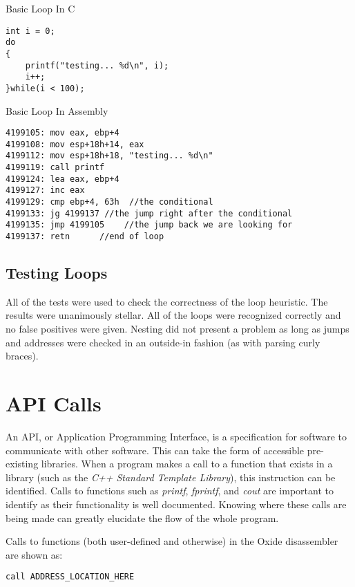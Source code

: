 \documentclass{article}
\begin{document}
\begin{algorithm}
\lstset{language=[mips]Assembler}
\caption{Basic Loop In C}
\begin{lstlisting}
int i = 0;
do
{
    printf("testing... %d\n", i);
    i++;
}while(i < 100);
\end{lstlisting}
\end{algorithm}

\begin{algorithm}
\lstset{language=[mips]Assembler}
\caption{Basic Loop In Assembly}
\begin{lstlisting}
4199105: mov eax, ebp+4
4199108: mov esp+18h+14, eax
4199112: mov esp+18h+18, "testing... %d\n"
4199119: call printf
4199124: lea eax, ebp+4
4199127: inc eax
4199129: cmp ebp+4, 63h  //the conditional
4199133: jg 4199137	//the jump right after the conditional
4199135: jmp 4199105    //the jump back we are looking for
4199137: retn      //end of loop
\end{lstlisting}
\end{algorithm}

\subsection*{Testing Loops}
All of the tests were used to check the correctness of the loop heuristic.  The results were unanimously stellar.  All of the loops were recognized
correctly and no false positives were given.  Nesting did not present a problem as long as jumps and addresses were checked in an outside-in fashion
(as with parsing curly braces).  

\pagebreak

\section*{API Calls}
An API, or Application Programming Interface, is a specification for software to communicate with other software.  This can take the form of
accessible pre-existing libraries.  When a program makes a call to a function that exists in a library (such as the \emph{C++ Standard Template Library}),
this instruction can be identified.  Calls to functions such as \emph{printf}, \emph{fprintf}, and \emph{cout} are important to identify as their
functionality is well documented. Knowing where these calls are being made can greatly elucidate the flow of the whole program.

Calls to functions (both user-defined and otherwise) in the Oxide disassembler are shown as:\\
\begin{algorithm}
\lstset{language=[mips]Assembler}
\begin{lstlisting}
call ADDRESS_LOCATION_HERE
\end{lstlisting}
\end{algorithm}
\end{document}
